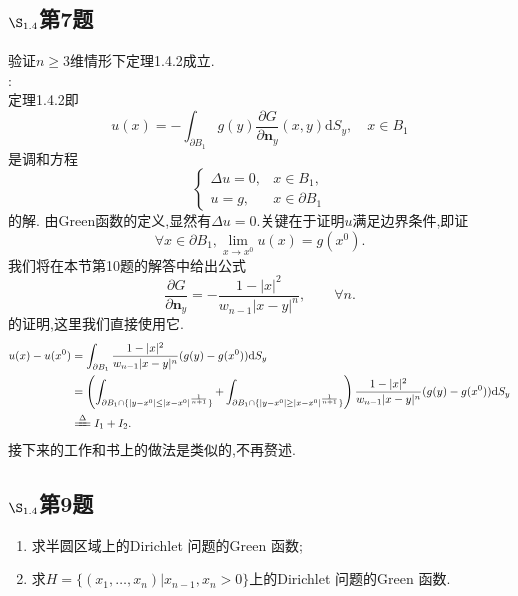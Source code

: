 \documentclass[12pt, a4paper]{ctexbook}
\newcommand{\dS}{\text{d}S}
\begin{document}
    \subsection{$\S_{1.4}$第7题}
    \kaishu{}验证$n\ge3$维情形下定理1.4.2成立.\\
    
    \songti{}:\\
    
    定理1.4.2即
    \begin{equation*}
    u(x)=- \int_{\partial B_1} g(y) \frac{\partial G}{\partial \bm{n}_y}(x,y) \dS_y,\quad x \in B_1
    \end{equation*}
    是调和方程
    \begin{equation*}
    \begin{cases}
    \Delta u =0,&x \in B_1,\\
    u = g, &x \in \partial B_1
    \end{cases}
    \end{equation*}
    的解.
    由Green函数的定义,显然有$\Delta u = 0$.关键在于证明$u$满足边界条件,即证
    \begin{equation*}
    \forall x \in \partial B_1 ,\lim_{x \to x^0}u(x) =g(x^0).
    \end{equation*}
    我们将在本节第10题的解答中给出公式$$
    \frac{\partial G}{\partial \bm{n}_y}=- \frac{1-|x|^2}{w_{n-1}|x-y|^n},\qquad \forall n. $$
    的证明,这里我们直接使用它.
    \begin{align*}
    u(x)-u(x^0)&=\int_{\partial B_1}  \frac{1-|x|^2}{w_{n-1}|x-y|^n} (g(y)-g(x^0))\dS_y\\
    &=\left(\int_{\partial B_1 \cap \{|y-x^0| \le |x-x^0|^{\frac{1}{n+1}}\}}+\int_{\partial B_1 \cap \{|y-x^0| \ge |x-x^0|^{\frac{1}{n+1}}\}}  \right)\frac{1-|x|^2}{w_{n-1}|x-y|^n} (g(y)-g(x^0))\dS_y\\
    &\xlongequal{\Delta}I_1+I_2.
    \end{align*}
    接下来的工作和书上的做法是类似的,不再赘述.
    
    \subsection{$\S_{1.4}$第9题}
    \kaishu{}
    \begin{enumerate}
        \item 求半圆区域上的Dirichlet 问题的Green 函数;
        \item 求$H = \{(x_1, \dots , x_n)|x_{n−1}, x_n > 0\} $上的Dirichlet 问题的Green 函数.
    \end{enumerate}
    
\end{document}
